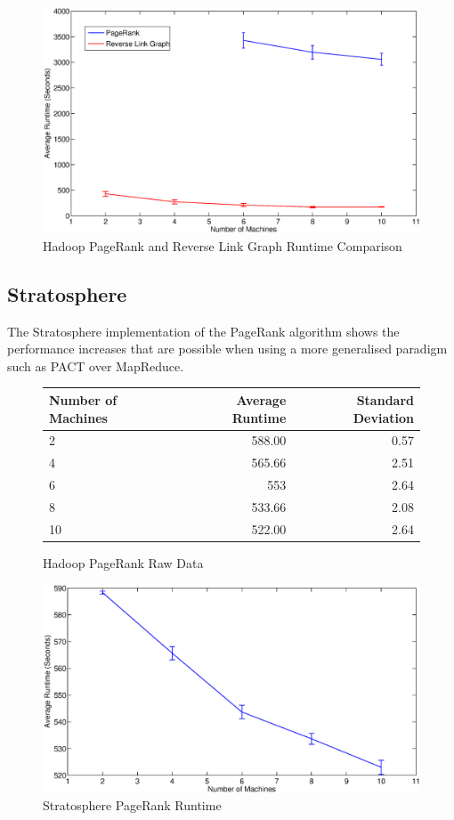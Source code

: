 \begin{figure}[H]
	\centering
	\includegraphics[scale=0.6]{resources/HadoopRLGvPR.eps}
	\caption{Hadoop PageRank and Reverse Link Graph Runtime Comparison}
	\label{hadoopRLGvPR}
\end{figure}

\subsection{Stratosphere}
The Stratosphere implementation of the PageRank algorithm shows the performance increases that are possible when using a more generalised paradigm such as PACT over MapReduce.  

\begin{figure}[H]
\centering
	\begin{tabular}{lrr}
		\toprule
		Number of Machines & Average Runtime & Standard Deviation \\
		\midrule

		2 & 588.00 & 0.57 \\
		4 & 565.66 & 2.51 \\
		6 & 553 & 2.64 \\
		8 & 533.66 & 2.08 \\
		10 & 522.00 & 2.64 \\
		\bottomrule
	\end{tabular}
	\caption{Hadoop PageRank Raw Data}
\end{figure}

\begin{figure}[H]
	\centering
	\includegraphics[scale=0.6]{resources/StratPR.eps}
	\caption{Stratosphere PageRank Runtime}
	\label{stratPR}
\end{figure}

